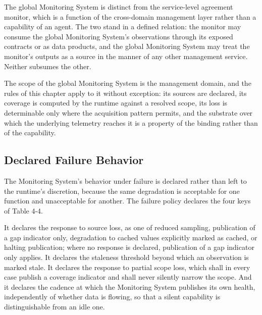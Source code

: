 The global Monitoring System is distinct from the service-level
agreement monitor, which is a function of the cross-domain management
layer rather than a capability of an agent. The two stand in a defined
relation: the monitor may consume the global Monitoring System's
observations through its exposed contracts or as data products, and the
global Monitoring System may treat the monitor's outputs as a source in
the manner of any other management service. Neither subsumes the other.

The scope of the global Monitoring System is the management domain, and
the rules of this chapter apply to it without exception: its sources are
declared, its coverage is computed by the runtime against a resolved
scope, its loss is determinable only where the acquisition pattern
permits, and the substrate over which the underlying telemetry reaches
it is a property of the binding rather than of the capability.

\hypertarget{declared-failure-behavior}{%
\subsection{Declared Failure Behavior}\label{declared-failure-behavior}}

The Monitoring System's behavior under failure is declared rather than
left to the runtime's discretion, because the same degradation is
acceptable for one function and unacceptable for another. The failure
policy declares the four keys of Table 4-4.

It declares the response to source loss, as one of reduced sampling,
publication of a gap indicator only, degradation to cached values
explicitly marked as cached, or halting publication; where no response
is declared, publication of a gap indicator only applies. It declares
the staleness threshold beyond which an observation is marked stale. It
declares the response to partial scope loss, which shall in every case
publish a coverage indicator and shall never silently narrow the scope.
And it declares the cadence at which the Monitoring System publishes its
own health, independently of whether data is flowing, so that a silent
capability is distinguishable from an idle one.

